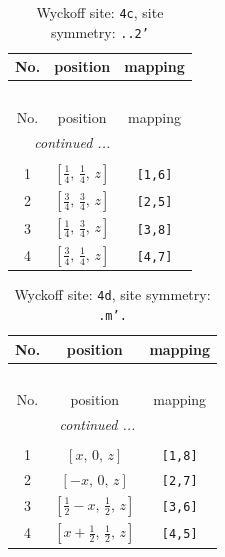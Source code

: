 \documentclass[fleqn,8pt]{jsarticle}
\begin{document}
\begin{longtable}{ccc}
\caption{Wyckoff site: {\tt 4c}, site symmetry: {\tt ..2'}}
 \\
 \hline \hline
No. & position & mapping \\ \hline \endfirsthead

\multicolumn{2}{l}{\tablename\ \thetable{}} \\
 \hline \hline
No. & position & mapping \\ \hline \endhead

 \hline \hline
\multicolumn{2}{r}{\footnotesize\it continued ...} \\ \endfoot

 \hline \hline
\multicolumn{2}{r}{} \\ \endlastfoot

1 & $\left[ \frac{1}{4},\, \frac{1}{4},\, z \right]$ & {\tt [1,6]} \\ \hline
2 & $\left[ \frac{3}{4},\, \frac{3}{4},\, z \right]$ & {\tt [2,5]} \\ \hline
3 & $\left[ \frac{1}{4},\, \frac{3}{4},\, z \right]$ & {\tt [3,8]} \\ \hline
4 & $\left[ \frac{3}{4},\, \frac{1}{4},\, z \right]$ & {\tt [4,7]} \\
\end{longtable}
\renewcommand{\arraystretch}{1.2}
\begin{longtable}{ccc}
\caption{Wyckoff site: {\tt 4d}, site symmetry: {\tt .m'.}}
 \\
 \hline \hline
No. & position & mapping \\ \hline \endfirsthead

\multicolumn{2}{l}{\tablename\ \thetable{}} \\
 \hline \hline
No. & position & mapping \\ \hline \endhead

 \hline \hline
\multicolumn{2}{r}{\footnotesize\it continued ...} \\ \endfoot

 \hline \hline
\multicolumn{2}{r}{} \\ \endlastfoot

1 & $\left[ x,\, 0,\, z \right]$ & {\tt [1,8]} \\ \hline
2 & $\left[ - x,\, 0,\, z \right]$ & {\tt [2,7]} \\ \hline
3 & $\left[ \frac{1}{2} - x,\, \frac{1}{2},\, z \right]$ & {\tt [3,6]} \\ \hline
4 & $\left[ x + \frac{1}{2},\, \frac{1}{2},\, z \right]$ & {\tt [4,5]} \\
\end{longtable}
\end{document}
